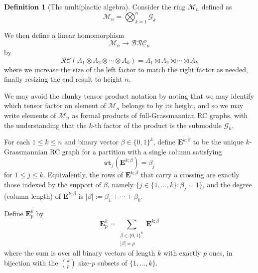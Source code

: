 \documentclass{amsart}
\theoremstyle{definition}
\newtheorem{definition}[lemma]{Definition}
\theoremstyle{remark}
\numberwithin{equation}{subsection}
\newcommand{\wtt}{\mathtt{wt}}
\newcommand{\grass}{\mathcal{G}}
\newcommand{\BRC}{\mathcal{BRC}}
\newcommand{\RC}{\mathcal{RC}}
\begin{document}
\begin{definition}[The multiplactic algebra]
Consider the ring $\mathcal{M}_n$ defined as
$$\mathcal{M}_n = \bigotimes_{k=1}^n \grass_k$$

We then define a linear homomorphism
$$\mathcal{M}_n\to \BRC_n$$
by
$$\RC(A_1\otimes A_2\otimes \cdots \otimes A_k) = A_1\boxtimes A_2\boxtimes \cdots \boxtimes A_k$$
where we increase the size of the left factor to match the right factor as needed, finally resizing the end result to height $n$.

We may avoid the clunky tensor product notation by noting that we may identify which tensor factor an element of $\mathcal{M}_n$ belongs to by its height, and so we may write elements of $\mathcal{M}_n$ as formal products of full-Grassmannian RC graphs, with the understanding that the $k$-th factor of the product is the submodule $\grass_k$.

For each $1\leq k\leq n$ and binary vector $\beta\in\{0,1\}^k$, define $\mathbf{E}^{k;\beta}$ to be the unique $k$-Grassmannian RC graph for a partition with a single column satisfying
$$\wtt_j(\mathbf{E}^{k;\beta}) = \beta_j$$
for $1\leq j\leq k$. Equivalently, the rows of $\mathbf{E}^{k;\beta}$ that carry a crossing are exactly those indexed by the support of $\beta$, namely $\{j\in\{1,\ldots,k\}:\beta_j=1\}$, and the degree (column length) of $\mathbf{E}^{k;\beta}$ is $|\beta|:=\beta_1+\cdots+\beta_k$.

Define $\mathbf{E}_{p}^k$ by
$$\mathbf{E}_{p}^k = \sum_{\substack{\beta\in\{0,1\}^k\\ |\beta|=p}} \mathbf{E}^{k;\beta}$$
where the sum is over all binary vectors of length $k$ with exactly $p$ ones, in bijection with the $\binom{k}{p}$ size-$p$ subsets of $\{1,\ldots,k\}$.
\end{definition}
\end{document}

